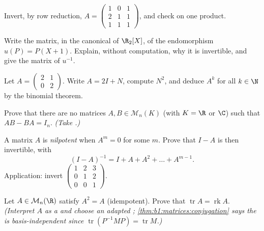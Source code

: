 \begin{exercise}[$\star$]\label{exo:b1:matrices:3}
Invert, by row reduction, $A = \begin{pmatrix} 1 & 0 & 1\\ 2 & 1 &
1\\ 1 & 1 & 1 \end{pmatrix}$, and check on one product.
\end{exercise}

\begin{exercise}[$\star$]\label{exo:b1:matrices:4}
Write the matrix, in the canonical  of $\R_2[X]$, of the
endomorphism $u(P) = P(X + 1)$. Explain, without computation, why
it is invertible, and give the matrix of $u^{-1}$.
\end{exercise}

\begin{exercise}[$\star\star$]\label{exo:b1:matrices:5}
Let $A = \begin{pmatrix} 2 & 1 \\ 0 & 2\end{pmatrix}$. Write $A =
2I + N$, compute $N^2$, and deduce $A^k$ for all $k \in \N$ by the
binomial theorem.
\end{exercise}

\begin{exercise}[$\star\star$]\label{exo:b1:matrices:6}
Prove that there are no matrices $A, B \in \mathcal{M}_n(K)$ (with
$K = \R$ or $\C$) such that $AB - BA = I_n$. \emph{(Take .)}
\end{exercise}

\begin{exercise}[$\star\star$]\label{exo:b1:matrices:7}
A matrix $A$ is \emph{nilpotent} when $A^m = 0$ for some $m$. Prove
that $I - A$ is then invertible, with
\[
(I - A)^{-1} = I + A + A^2 + \dots + A^{m-1} .
\]
Application: invert $\begin{pmatrix} 1 & 2 & 3\\ 0 & 1 & 2\\ 0 & 0 &
1\end{pmatrix}$.
\end{exercise}

\begin{exercise}[$\star\star$]\label{exo:b1:matrices:8}
Let $A \in \mathcal{M}_n(\R)$ satisfy $A^2 = A$ (idempotent). Prove
that $\operatorname{tr} A = \operatorname{rk} A$. \emph{(Interpret
$A$ as a  and choose an adapted ;
\cref{thm:b1:matrices:conjugation} says the  is
basis-independent since $\operatorname{tr}(P^{-1}MP) =
\operatorname{tr} M$.)}
\end{exercise}

